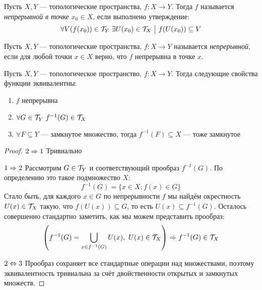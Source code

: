 \begin{definition}
	Пусть $X, Y$ --- топологические пространства, $f \colon X \to Y$. Тогда $f$ называется \textit{непрерывной в точке $x_0 \in X$}, если выполнено утверждение:
	\[
		\forall V(f(x_0)) \in \mathcal{T}_Y\ \exists U(x_0) \in \mathcal{T}_X \ \big|\  f(U(x_0)) \subseteq V
	\]
\end{definition}

\begin{definition}
	Пусть $X, Y$ --- топологические пространства, $f \colon X \to Y$ называется \textit{непрерывной}, если для любой точки $x \in X$ верно, что $f$ непрерывна в точке $x$.
\end{definition}

\begin{theorem}
	Пусть $X, Y$ --- топологическое пространство, $f \colon X \to Y$. Тогда следующие свойства функции эквивалентны:
	\begin{enumerate}
		\item $f$ непрерывна
		
		\item $\forall G \in \mathcal{T}_Y\ f^{-1}(G) \in \mathcal{T}_X$
		
		\item $\forall F \subseteq Y$ --- замкнутое множество, тогда $f^{-1}(F) \subseteq X$ --- тоже замкнутое
	\end{enumerate}
\end{theorem}

\begin{proof}
	\item $2 \Rightarrow 1$ Тривиально
	
	\item $1 \Rightarrow 2$ Рассмотрим $G \in \mathcal{T}_Y$ и соответствующий прообраз $f^{-1}(G)$. По определению это такое подмножество $X$:
	\[
		f^{-1}(G) = \{x \in X \colon f(x) \in G\}
	\]
	Стало быть, для каждого $x \in G$ по непрерывности $f$ мы найдём окрестность $U(x) \in \mathcal{T}_X$ такую, что $f(U(x)) \subseteq G$, то есть $U(x) \subseteq f^{-1}(G)$. Осталось совершенно стандартно заметить, как мы можем представить прообраз:
	\[
		\left(f^{-1}(G) = \bigcup_{x \in f^{-1}(G)} U(x),\ U(x) \in \mathcal{T}_X\right) \Rightarrow f^{-1}(G) \in \mathcal{T}_X
	\]
	
	\item $2 \Leftrightarrow 3$ Прообраз сохраняет все стандартные операции над множествами, поэтому эквивалентность тривиальна за счёт двойственности открытых и замкнутых множеств.
\end{proof}